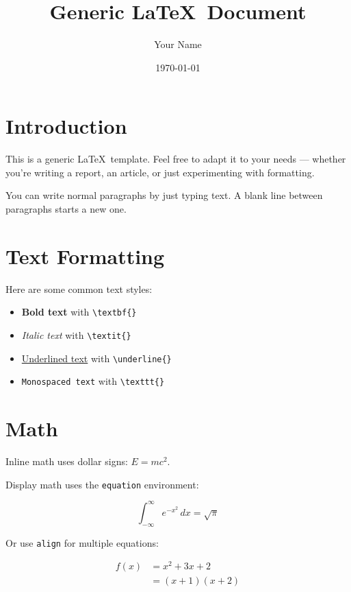 \documentclass[12pt, a4paper]{article}
\title{Generic \LaTeX\ Document}
\author{Your Name}
\date{\today}
\begin{document}
\maketitle
\tableofcontents
\newpage

\section{Introduction}

This is a generic \LaTeX\ template. Feel free to adapt it to your needs — 
whether you're writing a report, an article, or just experimenting with 
formatting.

You can write normal paragraphs by just typing text. A blank line between
paragraphs starts a new one.

\section{Text Formatting}

Here are some common text styles:

\begin{itemize}
  \item \textbf{Bold text} with \texttt{\textbackslash textbf\{\}}
  \item \textit{Italic text} with \texttt{\textbackslash textit\{\}}
  \item \underline{Underlined text} with \texttt{\textbackslash underline\{\}}
  \item \texttt{Monospaced text} with \texttt{\textbackslash texttt\{\}}
\end{itemize}

\section{Math}

Inline math uses dollar signs: $E = mc^2$.

Display math uses the \texttt{equation} environment:

\begin{equation}
  \int_{-\infty}^{\infty} e^{-x^2} \, dx = \sqrt{\pi}
\end{equation}

Or use \texttt{align} for multiple equations:

\begin{align}
  f(x) &= x^2 + 3x + 2 \\
       &= (x+1)(x+2)
\end{align}
\end{document}
